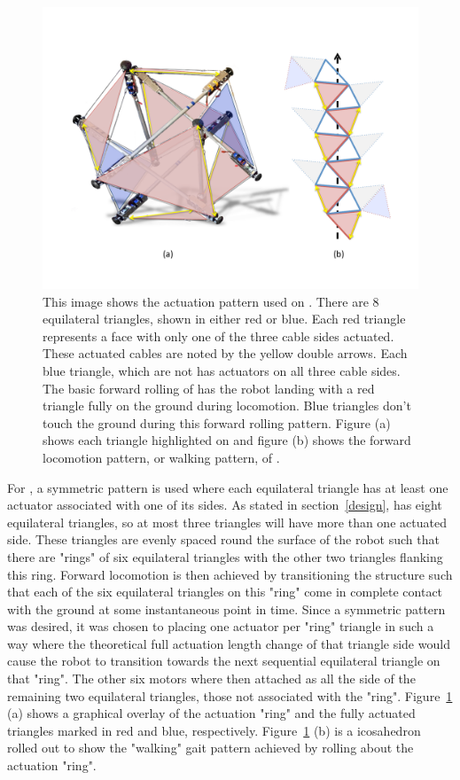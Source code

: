 \begin{figure}[thbp]
    \centering
    \includegraphics[width=0.8\linewidth]{tex/img/SB_RedvBlue_with_Walk}
    \caption{This image shows the actuation pattern used on \SB{}. There are 8 equilateral triangles, shown in either red or blue. Each red triangle represents a face with only one of the three cable sides actuated. These actuated cables are noted by the yellow double arrows. Each blue triangle, which are not  has actuators on all three cable sides. The basic forward rolling of \SB{} has the robot landing with a red triangle fully on the ground during locomotion. Blue triangles don't touch the ground during this forward rolling pattern. Figure (a) shows each triangle highlighted on \SB{} and figure (b) shows the forward locomotion pattern, or walking pattern, of \SB{}.}
    \label{fig:actuator_pattern}
\end{figure}

For \SB{}, a symmetric pattern is used where each equilateral triangle has at least one actuator associated with one of its sides.
As stated in section~\ref{design}, \SB{} has eight equilateral triangles, so at most three triangles will have more than one actuated side.
These triangles are evenly spaced round the surface of the robot such that there are "rings" of six equilateral triangles with the other two triangles flanking this ring.
Forward locomotion is then achieved by transitioning the structure such that each of the six equilateral triangles on this "ring" come in complete contact with the ground at some instantaneous point in time.
Since a symmetric pattern was desired, it was chosen to placing one actuator per "ring" triangle in such a way where the theoretical full actuation length change of that triangle side would cause the robot to transition towards the next sequential equilateral triangle on that "ring".
The other six motors where then attached as all the side of the remaining two equilateral triangles, those not associated with the "ring".
Figure~\ref{fig:actuator_pattern} (a) shows a graphical overlay of the actuation "ring" and the fully actuated triangles marked in red and blue, respectively.
Figure~\ref{fig:actuator_pattern} (b) is a icosahedron rolled out to show the "walking" gait pattern achieved by rolling about the actuation "ring".

